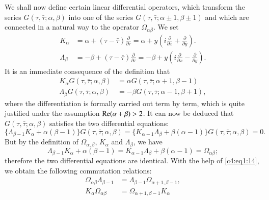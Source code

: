 We shall now define certain linear differential operators, which\break
transform the series $G(\tau,\bar{\tau};\alpha,\beta)$ into one of the
series $G(\tau,\bar{\tau}; \alpha\pm 1,\beta \pm 1)$ and which are
connected in a natural way to the operator $\Omega_{\alpha\beta}$. We
set
\begin{align*}
K_{\alpha} & =\alpha + (\tau-\bar{\tau}) \frac{\partial}{\partial
  \tau} = \alpha + y (i\frac{\partial}{\partial
  x}+\frac{\partial}{\partial y}). \tag{12}\label{c4:eq1:12}\\
\Lambda_{\beta} & = -\beta + (\tau-\bar{\tau})
\frac{\partial}{\partial \bar{\tau}} = -\beta + y (i
\frac{\partial}{\partial x} - 
\frac{\partial}{\partial y}). \tag{13}\label{c4:eq1:13}
\end{align*}
It is an immediate consequence of the definition that
\begin{align*}
K_{\alpha} G(\tau,\bar{\tau};\alpha,\beta) & = \alpha G
(\tau,\bar{\tau};\alpha+1,\beta-1)\\
\Lambda_{\beta} G(\tau, \bar{\tau};\alpha, \beta) &= -\beta G (\tau,
\bar{\tau}; \alpha -1, \beta+1), 
\end{align*}
where the differentiation is formally carried out term by term, which
is quite justified under the assumption $\operatorname{Re}(\alpha+\beta)>2$. It can
now be deduced that $G(\tau, \bar{\tau}; \alpha, \beta)$ satisfies the
two differential equations:
$$
\{\Lambda_{\beta-1} K_{\alpha} + \alpha (\beta-1)\} G(\tau,\bar{\tau};
\alpha, \beta) = \{K_{\alpha-1} \Lambda_{\beta} + \beta(\alpha-1)\}
G(\tau, \bar{\tau};\alpha, \beta) = 0.
$$
But by the definition of $\Omega_{\alpha,\beta}$, $K_{\alpha}$ and
$\Lambda_{\beta}$, we have 
\begin{equation*}
\Lambda_{\beta-1} K_{\alpha} + \alpha(\beta-1) = K_{\alpha-1}
\Lambda_{\beta} + \beta(\alpha-1) = 
\Omega_{\alpha \beta}; \tag{14}\label{c4:eq1:14}
\end{equation*}
therefore the two differential equations are identical. With the help
of \eqref{c4:eq1:14}, we obtain the following commutation relations:
\begin{align*}
\Omega_{\alpha\beta} \Lambda_{\beta-1} & = \Lambda_{\beta-1}
\Omega_{\alpha +1, \beta-1}, \\
K_{\alpha} \Omega_{\alpha \beta} & = \Omega_{\alpha+1,\beta-1}
K_{\alpha} \tag{15}\label{c4:eq1:15}
\end{align*}

